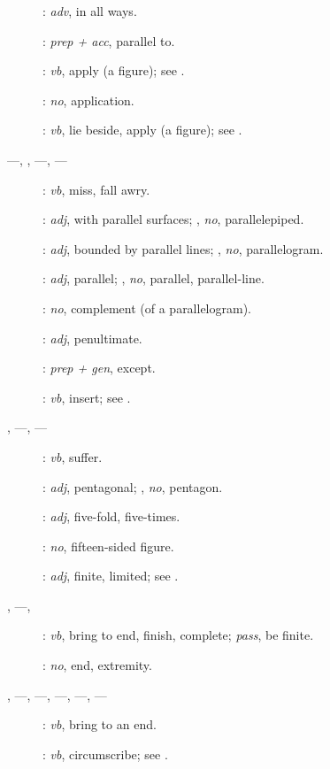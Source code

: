 {\begin{description}
\item[]: {\em adv}, in all ways.
\item[]: {\em prep + acc}, parallel to.
\item[]: {\em vb}, apply (a figure); see .
\item[]: {\em no}, application.
\item[]: {\em vb}, lie beside, apply (a figure); see .
\item[  ---, , ---, ---]: {\em vb}, miss, fall awry.
\item[]: {\em adj}, with parallel surfaces; , {\em no}, parallelepiped.
\item[]: {\em adj}, bounded by parallel
lines; , {\em no}, parallelogram.
\item[]: {\em adj}, parallel; , {\em no},
parallel, parallel-line.
\item[]: {\em no}, complement (of a parallelogram).
\item[]: {\em adj}, penultimate.
\item[]: {\em prep + gen}, except.
\item[]: {\em vb}, insert; see .
\item[, ---, ---]: {\em vb}, suffer.
\item[]: {\em adj}, pentagonal; ,
{\em no}, pentagon.
\item[]: {\em adj}, five-fold, five-times.
\item[]: {\em no}, fifteen-sided figure.
\item[]: {\em adj}, finite, limited; see \-.
\item[, ---, ]: {\em vb}, bring to end, finish, complete; {\em pass},  be finite.
\item[]: {\em no}, end, extremity.
\item[, ---, ---, ---, ---, ---]: {\em vb}, bring to an end.
\item[]: {\em vb}, circumscribe; see .

\end{description}}
